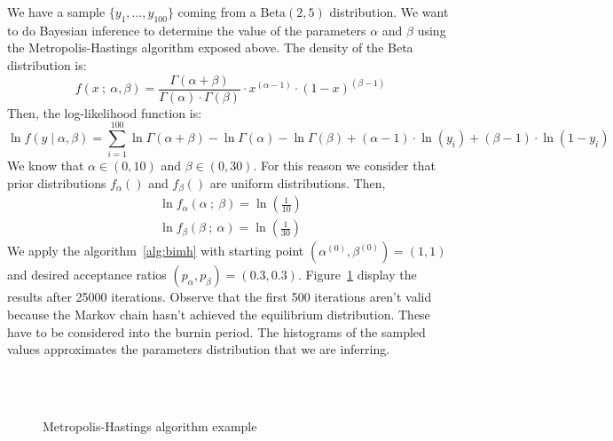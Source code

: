 \documentclass[11pt,fleqn]{book} %
\begin{document}
\begin{example}
	We have a sample $\{y_1,\dots,y_{100}\}$ coming from a $\text{Beta}(2,5)$ 
	distribution. We want to do Bayesian inference to determine the value of the 
	parameters $\alpha$ and $\beta$ using the Metropolis-Hastings algorithm exposed 
	above. The density of the Beta distribution is:
	\begin{displaymath}
		f(x\ ;\ \alpha, \beta) = 
		\frac{\Gamma(\alpha+\beta)}{\Gamma(\alpha) \cdot \Gamma(\beta)} 
		\cdot x^{(\alpha-1)} \cdot (1-x)^{(\beta-1)}
	\end{displaymath}
	Then, the log-likelihood function is:
	\begin{displaymath}
		\ln f(y \mid \alpha, \beta) = 
		\displaystyle \sum_{i=1}^{100} 
		\ln \Gamma(\alpha+\beta) - \ln \Gamma(\alpha) - \ln \Gamma(\beta) +
		(\alpha-1) \cdot \ln(y_i) + (\beta-1) \cdot \ln(1-y_i)
	\end{displaymath}
	We know that $\alpha \in (0,10)$ and $\beta \in (0,30)$. For this reason we 
	consider that prior distributions $f_{\alpha}()$ and $f_{\beta}()$ are 
	uniform distributions. Then,
	\begin{displaymath}
		\begin{array}{l}
			\ln f_{\alpha}(\alpha \ ;\ \beta) = \ln(\frac{1}{10})
			\\
			\ln f_{\beta}(\beta \ ;\ \alpha) = \ln(\frac{1}{30})
		\end{array}
	\end{displaymath}
	We apply the algorithm~\ref{alg:bimh} with starting point 
	$\left(\alpha^{(0)},\beta^{(0)}\right)=(1,1)$ and 
	desired acceptance ratios $(p_{\alpha},p_{\beta})=(0.3,0.3)$.
	Figure~\ref{fig:mhbd} display the results after 25000 iterations.
	Observe that the first 500 iterations aren't valid because the Markov 
	chain hasn't achieved the equilibrium distribution. These have to be 
	considered into the burnin period. The histograms of the sampled values
	approximates the parameters distribution that we are inferring.
	\begin{figure}[!ht]
		\centering
		\\
		\\
		\caption{Metropolis-Hastings algorithm example}
		\label{fig:mhbd}
	\end{figure}
\end{example}
\end{document}

